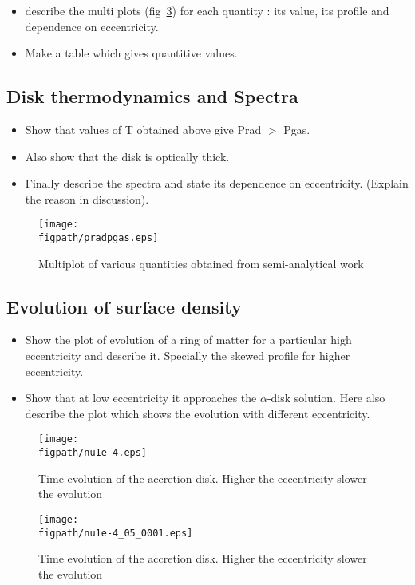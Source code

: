 \documentclass[useAMS,usenatbib]{mn2e}
\newcommand{\figpath}{./Figs/}
\begin{document}
\begin{itemize}
\item describe the multi plots (fig~\ref{fig:steadyplt1}) for each quantity : its value, its
  profile and dependence on eccentricity.
\item Make a table which gives quantitive values.  
\end{itemize}


\subsection{Disk thermodynamics and Spectra}
\begin{itemize}
\item Show that values of T obtained above give Prad $>$ Pgas. 
\item Also show that the disk is optically thick.
\item Finally describe the spectra and state its dependence on
  eccentricity. (Explain the reason in discussion).
\end{itemize}
\begin{figure}
\centering
\texttt{[image: \\figpath/pradpgas.eps]}
\caption{Multiplot of various quantities obtained from semi-analytical
  work}
\label{fig:steadyplt1}
\end{figure}
\subsection{Evolution of surface density}
\begin{itemize}
\item Show the plot of evolution of a ring of matter for a particular high
  eccentricity and describe it. Specially the skewed profile for
  higher eccentricity. 
\item Show that at low eccentricity it approaches the $\alpha$-disk
  solution. Here also describe the plot which shows the evolution with
  different eccentricity. 
\end{itemize}
\begin{figure}
\centering
\texttt{[image: \\figpath/nu1e-4.eps]}
\caption{Time evolution of the accretion disk. Higher the eccentricity slower the evolution}
\label{fig:steadyplt1}
\end{figure}
\begin{figure}
\centering
\texttt{[image: \\figpath/nu1e-4\_05\_0001.eps]}
\caption{Time evolution of the accretion disk. Higher the eccentricity slower the evolution}
\label{fig:steadyplt1}
\end{figure}
\end{document}

